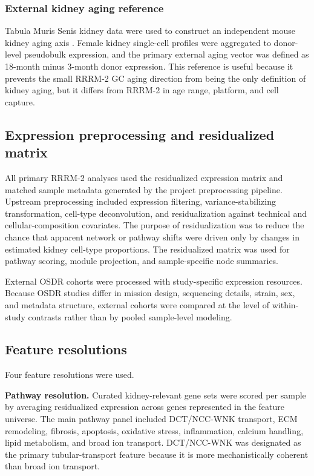 \documentclass[11pt]{article}
\begin{document}
\subsubsection{External kidney aging reference}

Tabula Muris Senis kidney data were used to construct an independent mouse kidney aging axis \citep{tabula2020}. Female kidney single-cell profiles were aggregated to donor-level pseudobulk expression, and the primary external aging vector was defined as 18-month minus 3-month donor expression. This reference is useful because it prevents the small RRRM-2 GC aging direction from being the only definition of kidney aging, but it differs from RRRM-2 in age range, platform, and cell capture.

\subsection{Expression preprocessing and residualized matrix}

All primary RRRM-2 analyses used the residualized expression matrix and matched sample metadata generated by the project preprocessing pipeline. Upstream preprocessing included expression filtering, variance-stabilizing transformation, cell-type deconvolution, and residualization against technical and cellular-composition covariates. The purpose of residualization was to reduce the chance that apparent network or pathway shifts were driven only by changes in estimated kidney cell-type proportions. The residualized matrix was used for pathway scoring, module projection, and sample-specific node summaries.

External OSDR cohorts were processed with study-specific expression resources. Because OSDR studies differ in mission design, sequencing details, strain, sex, and metadata structure, external cohorts were compared at the level of within-study contrasts rather than by pooled sample-level modeling.

\subsection{Feature resolutions}

Four feature resolutions were used.

\textbf{Pathway resolution.} Curated kidney-relevant gene sets were scored per sample by averaging residualized expression across genes represented in the feature universe. The main pathway panel included DCT/NCC-WNK transport, ECM remodeling, fibrosis, apoptosis, oxidative stress, inflammation, calcium handling, lipid metabolism, and broad ion transport. DCT/NCC-WNK was designated as the primary tubular-transport feature because it is more mechanistically coherent than broad ion transport.
\end{document}
